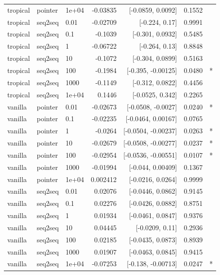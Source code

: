 \documentclass[10pt]{article}
\begin{document}
{\begin{longtable}{lllrrrl}
tropical & pointer & 1e+04 & -0.03835 & [-0.0859, 0.0092] & 0.1552 & \\
tropical & seq2seq & 0.01 & -0.02709 & [-0.224, 0.17] & 0.9991 & \\
tropical & seq2seq & 0.1 & -0.1039 & [-0.301, 0.0932] & 0.5485 & \\
tropical & seq2seq & 1 & -0.06722 & [-0.264, 0.13] & 0.8848 & \\
tropical & seq2seq & 10 & -0.1072 & [-0.304, 0.0899] & 0.5163 & \\
tropical & seq2seq & 100 & -0.1984 & [-0.395, -0.00125] & 0.0480 & *\\
tropical & seq2seq & 1000 & -0.1149 & [-0.312, 0.0822] & 0.4456 & \\
tropical & seq2seq & 1e+04 & 0.1446 & [-0.0525, 0.342] & 0.2265 & \\
vanilla & pointer & 0.01 & -0.02673 & [-0.0508, -0.0027] & 0.0240 & *\\
vanilla & pointer & 0.1 & -0.02235 & [-0.0464, 0.00167] & 0.0765 & \\
vanilla & pointer & 1 & -0.0264 & [-0.0504, -0.00237] & 0.0263 & *\\
vanilla & pointer & 10 & -0.02679 & [-0.0508, -0.00277] & 0.0237 & *\\
vanilla & pointer & 100 & -0.02954 & [-0.0536, -0.00551] & 0.0107 & *\\
vanilla & pointer & 1000 & -0.01994 & [-0.044, 0.00409] & 0.1367 & \\
vanilla & pointer & 1e+04 & 0.002412 & [-0.0216, 0.0264] & 0.9999 & \\
vanilla & seq2seq & 0.01 & 0.02076 & [-0.0446, 0.0862] & 0.9145 & \\
vanilla & seq2seq & 0.1 & 0.02276 & [-0.0426, 0.0882] & 0.8751 & \\
vanilla & seq2seq & 1 & 0.01934 & [-0.0461, 0.0847] & 0.9376 & \\
vanilla & seq2seq & 10 & 0.04445 & [-0.0209, 0.11] & 0.2936 & \\
vanilla & seq2seq & 100 & 0.02185 & [-0.0435, 0.0873] & 0.8939 & \\
vanilla & seq2seq & 1000 & 0.01907 & [-0.0463, 0.0845] & 0.9415 & \\
vanilla & seq2seq & 1e+04 & -0.07253 & [-0.138, -0.00713] & 0.0247 & *\\
\bottomrule
\end{longtable}
}
\end{document}
